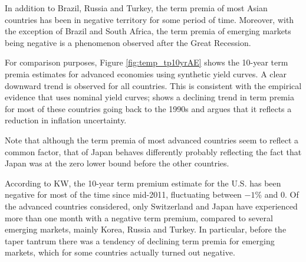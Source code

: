 { In addition to Brazil, Russia and Turkey, the term premia of most Asian countries has been in negative territory for some period of time. Moreover, with the exception of Brazil and South Africa, the term premia of emerging markets being negative is a phenomenon observed after the Great Recession.

%	

For comparison purposes, Figure \ref{fig:temp_tp10yrAE} shows the 10-year term premia estimates for advanced economies using synthetic yield curves. A clear downward trend is observed for all countries. This is consistent with the empirical evidence that uses nominal yield curves; \cite{Wright:2011} shows a declining trend in term premia for most of these countries going back to the 1990s and argues that it reflects a reduction in inflation uncertainty.
	

Note that although the term premia of most advanced countries seem to reflect a common factor, that of Japan behaves differently probably reflecting the fact that Japan was at the zero lower bound before the other countries.

According to KW, the 10-year term premium estimate for the U.S. has been negative for most of the time since mid-2011, fluctuating between $-1$\% and $0$. Of the advanced countries considered, only Switzerland and Japan have experienced more than one month with a negative term premium, compared to several emerging markets, mainly Korea, Russia and Turkey. In particular, before the taper tantrum there was a tendency of declining term premia for emerging markets, which for some countries actually turned out negative.

}
